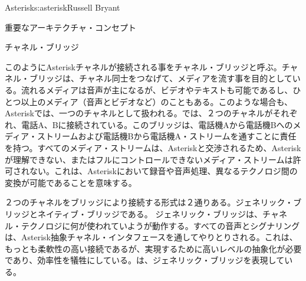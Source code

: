 \begin{aosachapter}{Asterisk}{s:asterisk}{Russell Bryant}
\begin{aosasect1}{重要なアーキテクチャ・コンセプト}
\begin{aosasect2}{チャネル・ブリッジ}

このようにAsteriskチャネルが接続される事をチャネル・ブリッジと呼ぶ。チャネル・ブリッジは、チャネル同士をつなげて、メディアを流す事を目的としている。流れるメディアは音声が主になるが、ビデオやテキストも可能であるし、ひとつ以上のメディア（音声とビデオなど）のこともある。このような場合も、Asteriskでは、一つのチャネルとして扱われる。では、２つのチャネルがそれぞれ、電話A、Bに接続されている。このブリッジは、電話機Aから電話機Bへのメディア・ストリームおよび電話機Bから電話機A・ストリームを通すことに責任を持つ。すべてのメディア・ストリームは、Asteriskと交渉されるため、Asteriskが理解できない、またはフルにコントロールできないメディア・ストリームは許可されない。これは、Asteriskにおいて録音や音声処理、異なるテクノロジ間の変換が可能であることを意味する。

２つのチャネルをブリッジにより接続する形式は２通りある。ジェネリック・ブリッジとネイティブ・ブリッジである。
ジェネリック・ブリッジは、チャネル・テクノロジに何が使われていようが動作する。すべての音声とシグナリングは、Asterisk抽象チャネル・インタフェースを通してやりとりされる。これは、もっとも柔軟性の高い接続であるが、実現するために高いレベルの抽象化が必要であり、効率性を犠牲にしている。は、ジェネリック・ブリッジを表現している。


\end{aosasect2}
\end{aosasect1}
\end{aosachapter}
